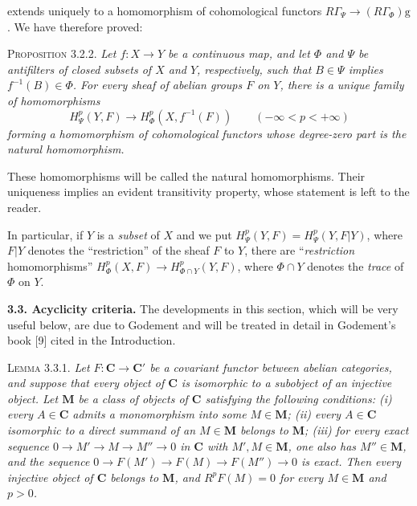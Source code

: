 
\noindent extends uniquely to a homomorphism of cohomological functors
$R\Gamma_\Psi\to (R\Gamma_\Phi)\mathrm{g}$.
We have therefore proved:

\indent\textsc{Proposition 3.2.2.} \textit{Let $f:X\to Y$ be a
continuous map, and let $\Phi$ and $\Psi$ be antifilters of closed subsets of
$X$ and $Y$, respectively, such that $B\in\Psi$ implies
$f^{-1}(B)\in\Phi$. For every sheaf of abelian groups $F$ on $Y$, there is a
unique family of homomorphisms}
\[
H^p_\Psi(Y,F)\to H^p_\Phi(X,f^{-1}(F))
\qquad(-\infty<p<+\infty)
\]
\textit{forming a homomorphism of cohomological functors whose degree-zero
part is the natural homomorphism.}

These homomorphisms will be called the natural homomorphisms. Their uniqueness
implies an evident transitivity property, whose statement is left to the
reader.

In particular, if $Y$ is a \textit{subset} of $X$ and we put
$H^p_\Psi(Y,F)=H^p_\Psi(Y,F\vert Y)$, where $F\vert Y$ denotes the
``restriction'' of the sheaf $F$ to $Y$, there are ``\textit{restriction}
homomorphisms''
$H^p_\Phi(X,F)\to H^p_{\Phi\cap Y}(Y,F)$,
where $\Phi\cap Y$ denotes the \textit{trace} of $\Phi$ on $Y$.

\indent\textbf{3.3. Acyclicity criteria.} The developments in this section, which
will be very useful below, are due to Godement and will be treated in detail
in Godement's book [9] cited in the Introduction.

\indent\textsc{Lemma 3.3.1.} \textit{Let $F:\mathbf C\to \mathbf C'$ be a covariant
functor between abelian categories, and suppose that every object of $\mathbf C$ is
isomorphic to a subobject of an injective object. Let $\mathbf M$ be a class
of objects of $\mathbf C$ satisfying the following conditions: \textup{(}i\textup{)} every $A\in \mathbf C$
admits a monomorphism into some $M\in\mathbf M$; \textup{(}ii\textup{)} every $A\in \mathbf C$
isomorphic to a direct summand of an $M\in\mathbf M$ belongs to $\mathbf M$;
\textup{(}iii\textup{)} for every exact sequence
$0\to M'\to M\to M''\to0$
in $\mathbf C$ with $M',M\in\mathbf M$, one also has $M''\in\mathbf M$, and the
sequence
$0\to F(M')\to F(M)\to
F(M'')\to0$ is exact. Then every injective object of $\mathbf C$ belongs
to $\mathbf M$, and $R^pF(M)=0$ for every $M\in\mathbf M$ and $p>0$.}

